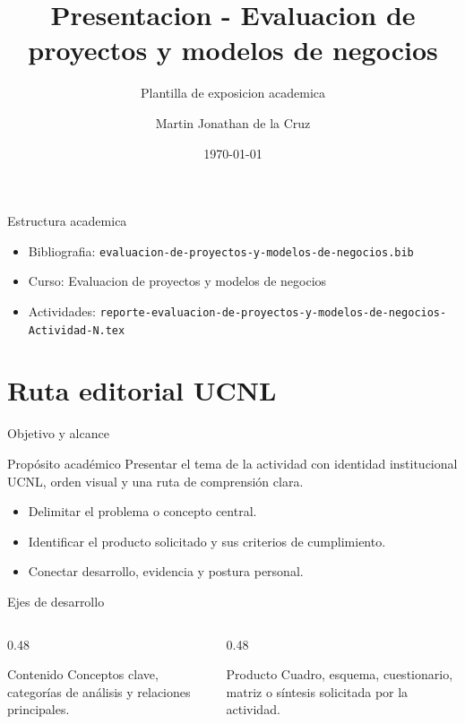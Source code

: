 ﻿\documentclass[spanish,aspectratio=169]{beamer}
\title{Presentacion - Evaluacion de proyectos y modelos de negocios}
\subtitle{Plantilla de exposicion academica}
\author{Martin Jonathan de la Cruz}
\institute{Universidad Ciudadana de Nuevo Leon}
\date{\today}
\begin{document}
\begin{frame}
  \titlepage
\end{frame}

\begin{frame}{Estructura academica}
  \begin{itemize}
    \item Bibliografia: \texttt{evaluacion-de-proyectos-y-modelos-de-negocios.bib}
    \item Curso: Evaluacion de proyectos y modelos de negocios
    \item Actividades: \texttt{reporte-evaluacion-de-proyectos-y-modelos-de-negocios-Actividad-N.tex}
  \end{itemize}
\end{frame}


\section{Ruta editorial UCNL}

\begin{frame}{Objetivo y alcance}
  \begin{block}{Propósito académico}
    Presentar el tema de la actividad con identidad institucional UCNL, orden visual y una ruta de comprensión clara.
  \end{block}
  \begin{itemize}
    \item Delimitar el problema o concepto central.
    \item Identificar el producto solicitado y sus criterios de cumplimiento.
    \item Conectar desarrollo, evidencia y postura personal.
  \end{itemize}
\end{frame}

\begin{frame}{Ejes de desarrollo}
  \begin{columns}[T,totalwidth=\textwidth]
    \begin{column}{0.48\textwidth}
      \begin{block}{Contenido}
        Conceptos clave, categorías de análisis y relaciones principales.
      \end{block}
    \end{column}
    \begin{column}{0.48\textwidth}
      \begin{block}{Producto}
        Cuadro, esquema, cuestionario, matriz o síntesis solicitada por la actividad.
      \end{block}
    \end{column}
  \end{columns}
\end{frame}
\end{document}
